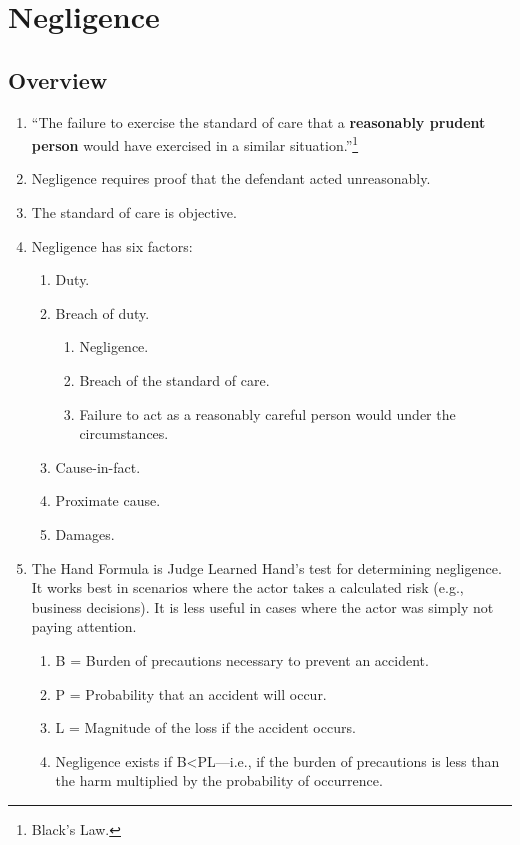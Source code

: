 \section{Negligence}

\subsection{Overview}

\begin{enumerate}
    \item ``The failure to exercise the standard of care that a \textbf{reasonably prudent person} would have exercised in a similar situation.''\footnote{Black's Law.}
    \item Negligence requires proof that the defendant acted unreasonably.
    \item The standard of care is objective.
    \item Negligence has six factors:
    \begin{enumerate}
        \item Duty.
        \item Breach of duty.
        \begin{enumerate}
            \item Negligence.
            \item Breach of the standard of care.
            \item Failure to act as a reasonably careful person would under the circumstances.
        \end{enumerate}
        \item Cause-in-fact.
        \item Proximate cause.
        \item Damages.
    \end{enumerate}
    \item The Hand Formula is Judge Learned Hand's test for determining negligence. It works best in scenarios where the actor takes a calculated risk (e.g., business decisions). It is less useful in cases where the actor was simply not paying attention.
    \begin{enumerate}
        \item B = Burden of precautions necessary to prevent an accident.
        \item P = Probability that an accident will occur.
        \item L = Magnitude of the loss if the accident occurs.
        \item Negligence exists if B\textless PL---i.e., if the burden of precautions is less than the harm multiplied by the probability of occurrence.
    \end{enumerate}
\end{enumerate}

